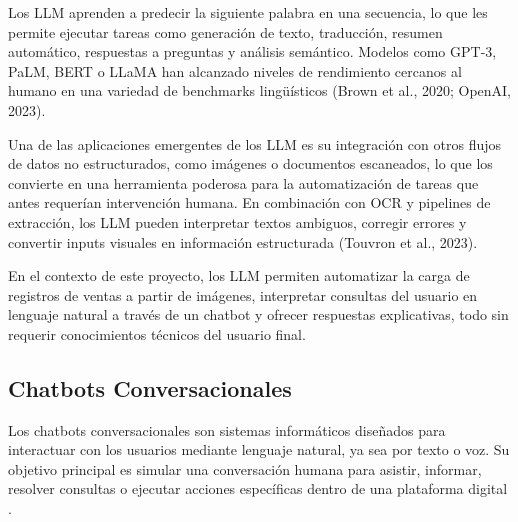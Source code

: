 \indent Los LLM aprenden a predecir la siguiente palabra en una secuencia, lo que les permite ejecutar tareas como generación de texto, traducción, resumen automático, respuestas a preguntas y análisis semántico. Modelos como GPT-3, PaLM, BERT o LLaMA han alcanzado niveles de rendimiento cercanos al humano en una variedad de benchmarks lingüísticos (Brown et al., 2020; OpenAI, 2023).

\indent Una de las aplicaciones emergentes de los LLM es su integración con otros flujos de datos no estructurados, como imágenes o documentos escaneados, lo que los convierte en una herramienta poderosa para la automatización de tareas que antes requerían intervención humana. En combinación con OCR y pipelines de extracción, los LLM pueden interpretar textos ambiguos, corregir errores y convertir inputs visuales en información estructurada (Touvron et al., 2023).

\indent En el contexto de este proyecto, los LLM permiten automatizar la carga de registros de ventas a partir de imágenes, interpretar consultas del usuario en lenguaje natural a través de un chatbot y ofrecer respuestas explicativas, todo sin requerir conocimientos técnicos del usuario final.

\subsection{Chatbots Conversacionales}

Los chatbots conversacionales son sistemas informáticos diseñados para interactuar con los usuarios mediante lenguaje natural, ya sea por texto o voz. Su objetivo principal es simular una conversación humana para asistir, informar, resolver consultas o ejecutar acciones específicas dentro de una plataforma digital \parencite{radziwill2017}.

